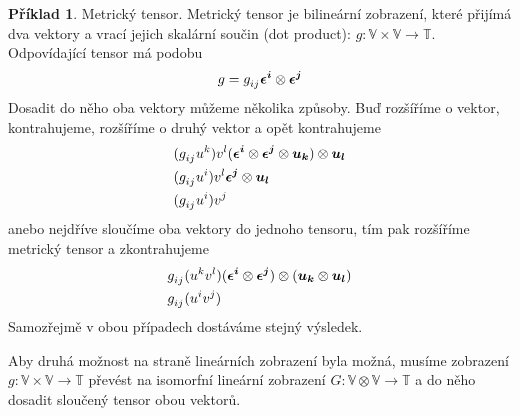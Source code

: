 \documentclass[a5paper,12pt]{amsbook}
\theoremstyle{definition}
\newtheorem{example}{Příklad}[chapter]
\newcommand{\myvec}[1]{\bm{#1}}
\newcommand{\myspace}[1]{\mathbb{#1}}
\begin{document}
\begin{example}
Metrický tensor. Metrický tensor je bilineární zobrazení, které přijímá dva vektory
a vrací jejich skalární součin (dot product): $g: \myspace{V}\times\myspace{V}\rightarrow\myspace{T}$.
Odpovídající tensor má podobu
\begin{equation*}
\begin{split}
g = g\indices{_i_j} \myvec{\epsilon^i}\otimes\myvec{\epsilon^j}
\end{split}
\end{equation*}
Dosadit do něho oba vektory můžeme několika způsoby. Buď rozšíříme o vektor,
kontrahujeme, rozšíříme o druhý vektor a opět kontrahujeme
\begin{equation*}
\begin{split}
&(g\indices{_i_j} u^k) v^l (\myvec{\epsilon^i}\otimes\myvec{\epsilon^j}\otimes\myvec{u_k})\otimes\myvec{u_l} \\
&(g\indices{_i_j} u^i) v^l \myvec{\epsilon^j}\otimes\myvec{u_l} \\
&(g\indices{_i_j} u^i) v^j
\end{split}
\end{equation*}
anebo nejdříve sloučíme oba vektory do jednoho tensoru, tím pak rozšíříme metrický tensor a zkontrahujeme
\begin{equation*}
\begin{split}
&g\indices{_i_j} (u^k v^l) (\myvec{\epsilon^i}\otimes\myvec{\epsilon^j})\otimes(\myvec{u_k}\otimes\myvec{u_l}) \\
&g\indices{_i_j} (u^i v^j)
\end{split}
\end{equation*}
Samozřejmě v obou případech dostáváme stejný výsledek.

Aby druhá možnost na straně lineárních zobrazení byla možná, musíme zobrazení
$g: \myspace{V}\times\myspace{V}\rightarrow\myspace{T}$ převést na isomorfní
lineární zobrazení $G: \myspace{V}\otimes\myspace{V}\rightarrow\myspace{T}$
a do něho dosadit sloučený tensor obou vektorů.


\end{example}
\end{document}
